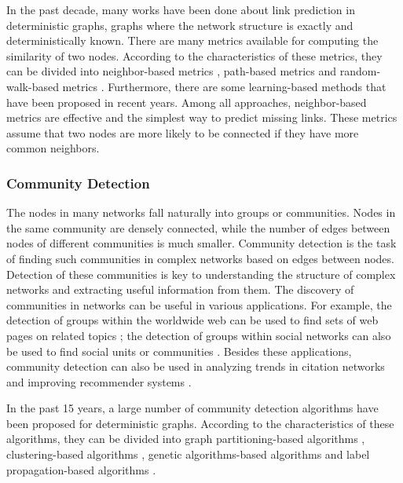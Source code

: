 \documentclass[\main/thesis.tex]{subfiles}
\begin{document}
In the past decade, many works have been done about link prediction in deterministic graphs, graphs where the network structure is exactly and deterministically known. There are many metrics available for computing the similarity of two nodes. According to the characteristics of these metrics, they can be divided into neighbor-based metrics \cite{newman2001clustering, salton1986introduction, jaccard1901etude, adamic2003friends, zhou2009predicting}, path-based metrics \cite{katz1953new,lu2009similarity} and random-walk-based metrics \cite{gobel1974random,liu2010link}. Furthermore, there are some learning-based methods \cite{liu2011link} that have been proposed in recent years. Among all approaches, neighbor-based metrics are effective and the simplest way to predict missing links. These metrics assume that two nodes are more likely to be connected if they have more common neighbors. 

\subsubsection{Community Detection}
The nodes in many networks fall naturally into groups or communities. Nodes in the same community are densely connected, while the number of edges between nodes of different communities is much smaller. Community detection is the task of finding such communities in complex networks based on edges between nodes. Detection of these communities is key to understanding the structure of complex networks and extracting useful information from them. The discovery of communities in networks can be useful in various applications. For example, the detection of groups within the worldwide web can be used to find sets of web pages on related topics \cite{flake2002self}; the detection of groups within social networks can also be used to find social units or communities \cite{girvan2002community}. Besides these applications, community detection can also be used in analyzing trends in citation networks \cite{bedi2016community} and improving recommender systems \cite{cao2015improved}. 

In the past 15 years, a large number of community detection algorithms have been proposed for deterministic graphs. According to the characteristics of these algorithms, they can be divided into graph partitioning-based algorithms \cite{kernighan1970efficient,newman2013community}, clustering-based algorithms \cite{girvan2002community,newman2004fast,blondel2008fast,clauset2004finding}, genetic algorithms-based algorithms \cite{pizzuti2008ga} and label propagation-based algorithms \cite{raghavan2007near}.
\end{document}
